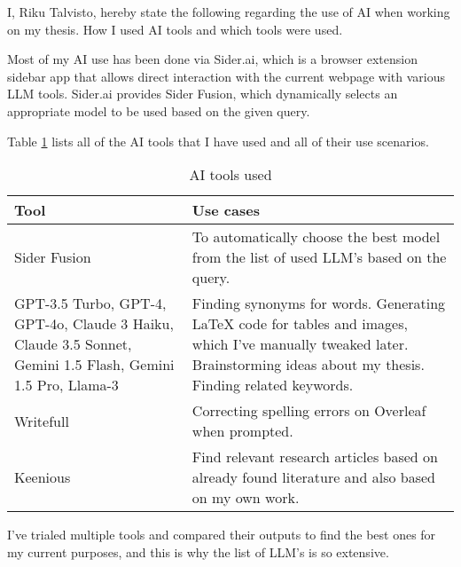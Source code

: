 

I, Riku Talvisto, hereby state the following regarding the use of AI when working on my thesis. How I used AI tools and which tools were used.

Most of my AI use has been done via Sider.ai, which is a browser extension sidebar app that allows direct interaction with the current webpage with various LLM tools. Sider.ai provides Sider Fusion, which dynamically selects an appropriate model to be used based on the given query.

Table \ref{tab:declaration} lists all of the AI tools that I have used and all of their use scenarios.

\begin{table}[h]
  \centering
  \begin{tabular}{m{5cm}m{8cm}}
    \hline
    \textbf{Tool} & \textbf{Use cases} \\
    \hline
    Sider Fusion & To automatically choose the best model from the list of used LLM's based on the query. \\
    \hline
    GPT-3.5 Turbo, GPT-4, GPT-4o, Claude 3 Haiku, Claude 3.5 Sonnet, Gemini 1.5 Flash, Gemini 1.5 Pro, Llama-3 & Finding synonyms for words. Generating LaTeX code for tables and images, which I’ve manually tweaked later. Brainstorming ideas about my thesis. Finding related keywords. \\
    \hline
    Writefull & Correcting spelling errors on Overleaf when prompted. \\
    \hline
    Keenious & Find relevant research articles based on already found literature and also based on my own work. \\
    \hline
  \end{tabular}
  \caption{AI tools used}
  \label{tab:declaration}
\end{table}

I've trialed multiple tools and compared their outputs to find the best ones for my current purposes, and this is why the list of LLM's is so extensive.